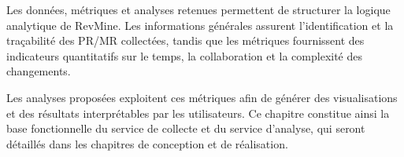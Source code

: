 Les données, métriques et analyses retenues permettent de structurer la logique analytique de RevMine. Les informations générales assurent l’identification et la traçabilité des PR/MR collectées, tandis que les métriques fournissent des indicateurs quantitatifs sur le temps, la collaboration et la complexité des changements.

Les analyses proposées exploitent ces métriques afin de générer des visualisations et des résultats interprétables par les utilisateurs. Ce chapitre constitue ainsi la base fonctionnelle du service de collecte et du service d’analyse, qui seront détaillés dans les chapitres de conception et de réalisation.